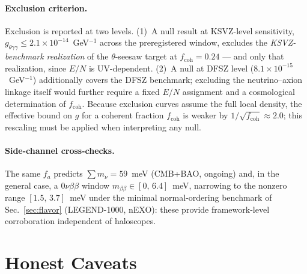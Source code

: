 \documentclass[11pt,a4paper]{article}
\begin{document}
\paragraph{Exclusion criterion.} Exclusion is reported at two levels.
(1)~A null result at KSVZ-level sensitivity,
$g_{\theta\gamma\gamma} \le 2.1\times 10^{-14}$~GeV$^{-1}$ across the
preregistered window, excludes the \emph{KSVZ-benchmark realization} of the
$\theta$-seesaw target at $f_{\mathrm{coh}} = 0.24$ --- and only that
realization, since $E/N$ is UV-dependent. (2)~A null at DFSZ level
($8.1\times 10^{-15}$~GeV$^{-1}$) additionally covers the DFSZ benchmark;
excluding the neutrino--axion linkage itself would further require a fixed
$E/N$ assignment and a cosmological determination of $f_{\mathrm{coh}}$.
Because exclusion curves assume the full local density, the effective bound on
$g$ for a coherent fraction $f_{\mathrm{coh}}$ is weaker by
$1/\sqrt{f_{\mathrm{coh}}} \approx 2.0$; this rescaling must be applied when
interpreting any null.

\paragraph{Side-channel cross-checks.} The same $f_a$ predicts
$\sum m_\nu = 59$~meV (CMB+BAO, ongoing) and, in the general case, a
$0\nu\beta\beta$ window $m_{\beta\beta} \in [0,\, 6.4]$~meV, narrowing to
the nonzero range $[1.5,\,3.7]$~meV under the minimal normal-ordering
benchmark of
Sec.~\ref{sec:flavor} (LEGEND-1000, nEXO): these provide
framework-level corroboration independent of haloscopes.

\section{Honest Caveats}
\label{sec:caveats}
\end{document}
